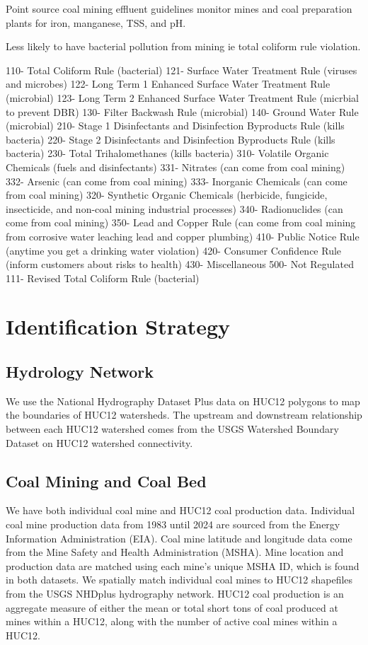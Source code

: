 \documentclass{article}
\begin{document}
Point source coal mining effluent guidelines monitor mines and coal preparation plants for iron, manganese, TSS, and pH.



Less likely to have bacterial pollution from mining ie total coliform rule violation.

110- Total Coliform Rule (bacterial)
121- Surface Water Treatment Rule (viruses and microbes)
122- Long Term 1 Enhanced Surface Water Treatment Rule (microbial)
123- Long Term 2 Enhanced Surface Water Treatment Rule (micrbial to prevent DBR)
130- Filter Backwash Rule (microbial)
140- Ground Water Rule (microbial)
210- Stage 1 Disinfectants and Disinfection Byproducts Rule (kills bacteria)
220- Stage 2 Disinfectants and Disinfection Byproducts Rule (kills bacteria)
230- Total Trihalomethanes (kills bacteria)
310- Volatile Organic Chemicals (fuels and disinfectants)
331- Nitrates (can come from coal mining)
332- Arsenic (can come from coal mining)
333- Inorganic Chemicals (can come from coal mining)
320- Synthetic Organic Chemicals (herbicide, fungicide, insecticide, and non-coal mining industrial processes)
340- Radionuclides (can come from coal mining)
350- Lead and Copper Rule (can come from coal mining from corrosive water leaching lead and copper plumbing)
410- Public Notice Rule (anytime you get a drinking water violation)
420- Consumer Confidence Rule (inform customers about risks to health)
430- Miscellaneous
500- Not Regulated
111- Revised Total Coliform Rule (bacterial)

\section{Identification Strategy}

\subsection{Hydrology Network}

We use the National Hydrography Dataset Plus data on HUC12 polygons to map the boundaries of HUC12 watersheds. The upstream and downstream relationship between each HUC12 watershed comes from the USGS Watershed Boundary Dataset on HUC12 watershed connectivity.

\subsection{Coal Mining and Coal Bed}

We have both individual coal mine and HUC12 coal production data. Individual coal mine production data from 1983 until 2024 are sourced from the Energy Information Administration (EIA). Coal mine latitude and longitude data come from the Mine Safety and Health Administration (MSHA). Mine location and production data are matched using each mine's unique MSHA ID, which is found in both datasets. We spatially match individual coal mines to HUC12 shapefiles from the USGS NHDplus hydrography network. HUC12 coal production is an aggregate measure of either the mean or total short tons of coal produced at mines within a HUC12, along with the number of active coal mines within a HUC12.
\end{document}
